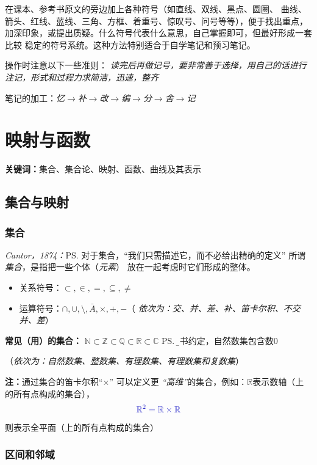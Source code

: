 \begin{shaded}
	在课本、参考书原文的旁边加上各种符号（如直线、双线、黑点、圆圈、
	曲线、箭头、红线、蓝线、三角、方框、着重号、惊叹号、问号等等），便于找出重点，
	加深印象，或提出质疑。什么符号代表什么意思，自己掌握即可，但最好形成一套比较
	稳定的符号系统。这种方法特别适合于自学笔记和预习笔记。
	
	操作时注意以下一些准则：
	{\it 读完后再做记号，要非常善于选择，用自己的话进行注记，形式和过程力求简洁，迅速，整齐}
	
	笔记的加工：{\it 忆$\to$补$\to$改$\to$编$\to$分$\to$舍$\to$记}	
\end{shaded}

\chapter{映射与函数}

{\bf 关键词：}集合、集合论、映射、函数、曲线及其表示

\section{集合与映射}

\subsection{集合}

{\it Cantor，1874：}\ps{对于集合，“我们只需描述它，而不必给出精确的定义”}
所谓{\it 集合}，是指把一些个体（{\it 元素}） 放在一起考虑时它们形成的整体。
\begin{itemize}
  \item 关系符号：$\subset, \in, =, \subseteq, \neq$
  \item 运算符号：$\cap,\cup, \setminus, \bar{A}, \times, +, - $\quad （{\it
  依次为：交、并、差、补、笛卡尔积、不交并、差}）
\end{itemize}
	
{\bf 常见（用）的集合：}
$\mathbb{N}\subset\mathbb{Z}\subset\mathbb{Q}\subset\mathbb{R}\subset\mathbb{C}$
\ps{\b 本书约定，自然数集包含数$0$}
	
\quad （{\it 依次为：自然数集、整数集、有理数集、有理数集和复数集}）

{\bf 注：}通过集合的笛卡尔积“$\times$” 可以定义更{\it
“高维”}的集合，例如：$\mathbb{R}$表示数轴（上的所有点构成的集合），
$${\b \mathbb{R}^2=\mathbb{R}\times\mathbb{R}}$$
则表示全平面（上的所有点构成的集合）

\subsection{区间和邻域}

